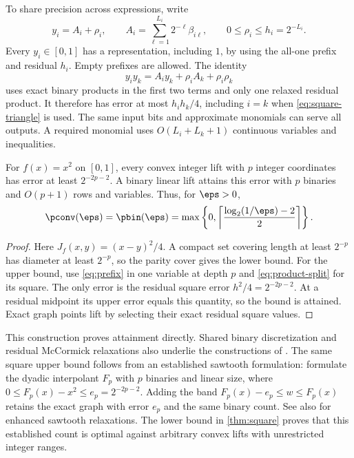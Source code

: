 To share precision across expressions, write
\begin{equation}\label{eq:prefix}
 y_i=A_i+\rho_i,\qquad
 A_i=\sum_{\ell=1}^{L_i}2^{-\ell}\beta_{i\ell},\qquad
 0\le\rho_i\le h_i=2^{-L_i}.
\end{equation}
Every $y_i\in[0,1]$ has a representation, including $1$, by using the
all-one prefix and residual $h_i$. Empty prefixes are allowed.
The identity
\begin{equation}\label{eq:product-split}
 y_i y_k=A_i y_k+\rho_i A_k+\rho_i\rho_k
\end{equation}
uses exact binary products in the first two terms and only one relaxed
residual product. It therefore has error at most $h_i h_k/4$, including
$i=k$ when \eqref{eq:square-triangle} is used. The same input bits and
approximate monomials can serve all outputs. A required monomial uses
$O(L_i+L_k+1)$ continuous variables and inequalities.

\begin{theorem}\label{thm:square}
For $f(x)=x^2$ on $[0,1]$, every convex integer lift with $p$ integer
coordinates has error at least $2^{-2p-2}$. A binary linear lift attains
this error with $p$ binaries and $O(p+1)$ rows and variables. Thus, for
$\eps>0$,
\[
 \pconv(\eps)=\pbin(\eps)
 =\max\left\{0,\left\lceil\frac{\log_2(1/\eps)-2}{2}\right\rceil\right\}.
\]
\end{theorem}
\begin{proof}
Here $J_f(x,y)=(x-y)^2/4$. A compact set covering length at least
$2^{-p}$ has diameter at least $2^{-p}$, so the parity cover gives the
lower bound. For the upper bound, use \eqref{eq:prefix} in one variable
at depth $p$ and \eqref{eq:product-split} for its square. The only error
is the residual square error $h^2/4=2^{-2p-2}$. At a residual midpoint
its upper error equals this quantity, so the bound is attained. Exact
graph points lift by selecting their exact residual square values.
\end{proof}

This construction proves attainment directly. Shared binary discretization
and residual McCormick relaxations also underlie the constructions of
\citet{beach2024b}. The same square upper bound follows from an established
sawtooth formulation: \citet[Section 2.1 and Proposition 1]{beach2022}
formulate the dyadic interpolant $F_p$ with $p$ binaries and linear size,
where $0\le F_p(x)-x^2\le e_p=2^{-2p-2}$. Adding the band
$F_p(x)-e_p\le w\le F_p(x)$ retains the exact graph with error $e_p$
and the same binary count. See also \citet{beach2024} for enhanced
sawtooth relaxations. The lower bound in \cref{thm:square} proves that
this established count is optimal against arbitrary convex lifts with
unrestricted integer ranges.

